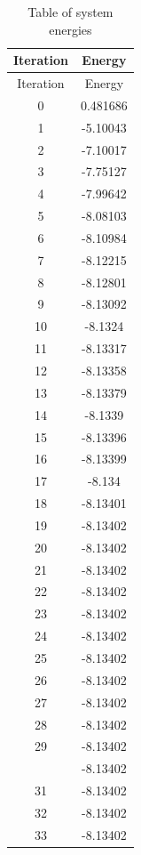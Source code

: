\documentclass[12pt,a4paper]{article}
\numberwithin{equation}{section}
\numberwithin{figure}{section}
\numberwithin{table}{section}
\begin{document}
	\begin{longtable}{|c|c|}
		\caption{Table of system energies}
		\label{tab:energy}\\
		\hline
		Iteration & Energy\\
		\hline
		\endfirsthead
		
		\hline
		Iteration & Energy\\
		\hline
		\endhead
		
0 & 0.481686 \\ \hline
1 & -5.10043 \\ \hline
2 & -7.10017 \\ \hline
3 & -7.75127 \\ \hline
4 & -7.99642 \\ \hline
5 & -8.08103 \\ \hline
6 & -8.10984 \\ \hline
7 & -8.12215 \\ \hline
8 & -8.12801 \\ \hline
9 & -8.13092 \\ \hline
10 & -8.1324 \\ \hline
11 & -8.13317 \\ \hline
12 & -8.13358 \\ \hline
13 & -8.13379 \\ \hline
14 & -8.1339 \\ \hline
15 & -8.13396 \\ \hline
16 & -8.13399 \\ \hline
17 & -8.134 \\ \hline
18 & -8.13401 \\ \hline
19 & -8.13402 \\ \hline
20 & -8.13402 \\ \hline
21 & -8.13402 \\ \hline
22 & -8.13402 \\ \hline
23 & -8.13402 \\ \hline
24 & -8.13402 \\ \hline
25 & -8.13402 \\ \hline
26 & -8.13402 \\ \hline
27 & -8.13402 \\ \hline
28 & -8.13402 \\ \hline
29 & -8.13402 \\ \hline
\pagebreak
30 & -8.13402 \\ \hline
31 & -8.13402 \\ \hline
32 & -8.13402 \\ \hline
33 & -8.13402 \\ \hline

\end{longtable}
\end{document}
